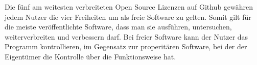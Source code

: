 
Die fünf am weitesten verbreiteten Open Source Lizenzen auf Github gew\"ahren jedem Nutzer die vier Freiheiten um als freie Software zu gelten. Somit gilt f\"ur die meiste ver\"offentlichte Software, dass man sie ausf\"uhren, untersuchen, weiterverbreiten und verbessern darf. Bei freier Software kann der Nutzer das Programm kontrollieren, im Gegensatz zur properitären Software, bei der der Eigentümer die Kontrolle \"uber die Funktionsweise hat. 